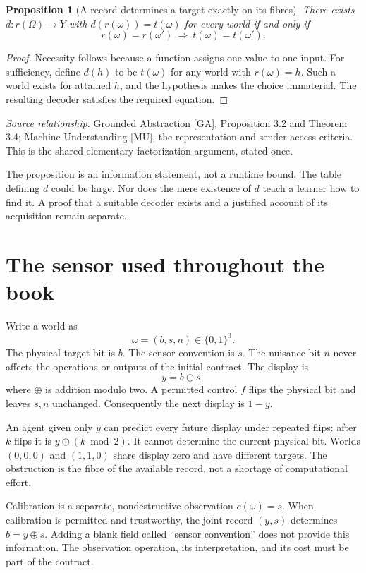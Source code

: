 \documentclass[11pt,oneside,openany]{book}
\newtheorem{proposition}[theorem]{Proposition}
\theoremstyle{definition}\newtheorem{definition}[theorem]{Definition}
\newcommand{\source}[1]{\par{\small\textit{Source relationship.} #1}\par}
\begin{document}
\begin{proposition}[A record determines a target exactly on its fibres]\label{r:factor}
There exists $d:r(\Omega)\to Y$ with $d(r(\omega))=t(\omega)$ for every world if and only if
\[
r(\omega)=r(\omega')\ \Longrightarrow\ t(\omega)=t(\omega').
\]
\end{proposition}
\begin{proof}
Necessity follows because a function assigns one value to one input. For sufficiency, define $d(h)$ to be $t(\omega)$ for any world with $r(\omega)=h$. Such a world exists for attained $h$, and the hypothesis makes the choice immaterial. The resulting decoder satisfies the required equation.
\end{proof}
\source{Grounded Abstraction [GA], Proposition 3.2 and Theorem 3.4; Machine Understanding [MU], the representation and sender-access criteria. This is the shared elementary factorization argument, stated once.}

The proposition is an information statement, not a runtime bound. The table defining $d$ could be large. Nor does the mere existence of $d$ teach a learner how to find it. A proof that a suitable decoder exists and a justified account of its acquisition remain separate.

\section{The sensor used throughout the book}
Write a world as
\[
\omega=(b,s,n)\in\{0,1\}^3.
\]
The physical target bit is $b$. The sensor convention is $s$. The nuisance bit $n$ never affects the operations or outputs of the initial contract. The display is
\[
y=b\oplus s,
\]
where $\oplus$ is addition modulo two. A permitted control $f$ flips the physical bit and leaves $s,n$ unchanged. Consequently the next display is $1-y$.

An agent given only $y$ can predict every future display under repeated flips: after $k$ flips it is $y\oplus(k\bmod2)$. It cannot determine the current physical bit. Worlds $(0,0,0)$ and $(1,1,0)$ share display zero and have different targets. The obstruction is the fibre of the available record, not a shortage of computational effort.

Calibration is a separate, nondestructive observation $c(\omega)=s$. When calibration is permitted and trustworthy, the joint record $(y,s)$ determines $b=y\oplus s$. Adding a blank field called ``sensor convention'' does not provide this information. The observation operation, its interpretation, and its cost must be part of the contract.
\end{document}
